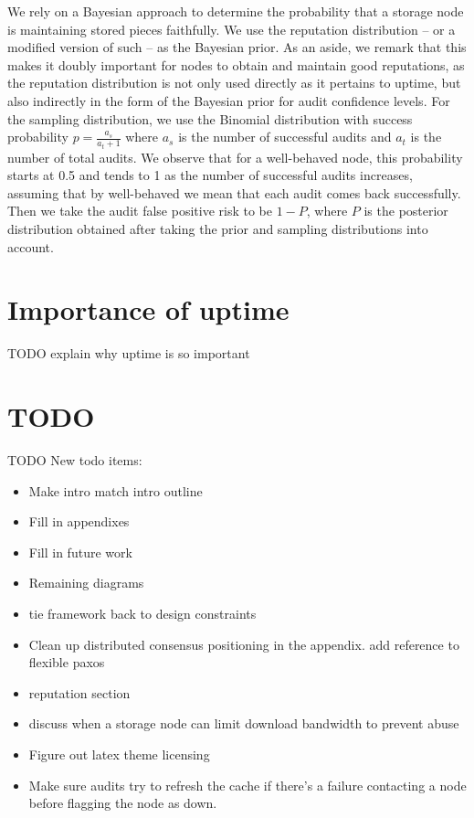 \documentclass[11pt,fleqn,openany]{book}
\newcommand{\todo}[1]{{\color{red} TODO #1 }}
\begin{document}
We rely on a Bayesian approach to determine the probability
that a storage node is maintaining stored pieces faithfully.
We use the reputation distribution -- or a modified version of such --
as the Bayesian prior. As an aside, we remark that this makes it doubly important
for nodes to obtain and maintain good reputations,
as the reputation distribution is not only used directly as it pertains to uptime,
but also indirectly in the form of the Bayesian prior for audit confidence levels.
For the sampling distribution, we use the Binomial distribution with
success probability $p=\frac{a_s}{a_t+1}$ where $a_s$ is the number of
successful audits and $a_t$ is the number of total audits.
We observe that for a well-behaved node, this probability starts at 0.5
and tends to 1 as the number of successful audits increases,
assuming that by well-behaved we mean that each audit comes back successfully.
Then we take the audit false positive risk to be $1-P$,
where $P$ is the posterior distribution obtained after taking the
prior and sampling distributions into account.

\chapter{Importance of uptime}\label{appendix:uptime-importance}

\todo{explain why uptime is so important}

\chapter{TODO}

\todo{
New todo items:
\begin{itemize}
\item Make intro match intro outline
\item Fill in appendixes
\item Fill in future work
\item Remaining diagrams
\item tie framework back to design constraints
\item Clean up distributed consensus positioning in the appendix.
  add reference to flexible paxos
\item reputation section
\item discuss when a storage node can limit download bandwidth to prevent
  abuse
\item Figure out latex theme licensing
\item Make sure audits try to refresh the cache if there's a failure contacting
  a node before flagging the node as down.
\end{itemize}
}

\newpage

\begingroup
\raggedright

\endgroup
\end{document}
